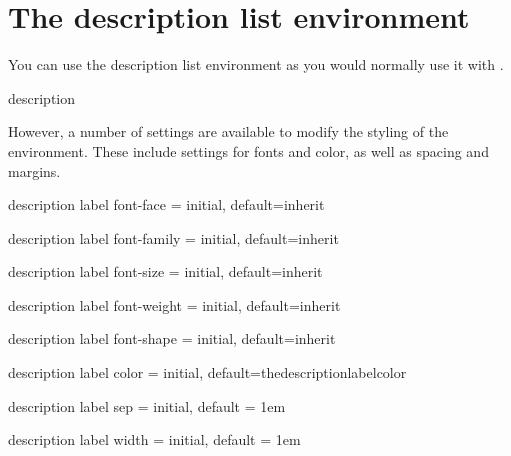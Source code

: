 \medskip
{\centering
\drawlistdiagram

}
\medskip
%
\section{The description list environment}

You can use the description list environment as you would normally use it with \latexe.

\begin{docEnv} {description} {}
\end{docEnv}

However, a number of settings are available to modify the styling of the environment. These 
include settings for fonts and color, as well as spacing and margins.

\begin{docKey} {description label font-face} { =  } {initial, default=inherit}
\end{docKey}

\begin{docKey} {description label font-family} { =  } {initial, default=inherit}
\end{docKey}

\begin{docKey} {description label font-size} { =  } {initial, default=inherit}
\end{docKey}

\begin{docKey} {description label font-weight} { =  } {initial, default=inherit}
\end{docKey}

\begin{docKey} {description label font-shape} { =  } {initial, default=inherit}
\end{docKey}

\begin{docKey} {description label color} { =  } {initial, default=thedescriptionlabelcolor}
\end{docKey}

\begin{docKey} {description label sep} { =  } {initial, default = 1em}
\end{docKey}

\begin{docKey} {description label width} { =  } {initial, default = 1em}
\end{docKey}

